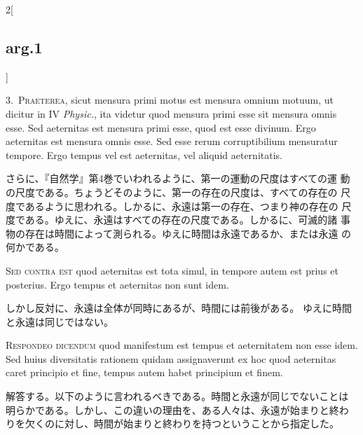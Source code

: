 \documentclass[paper=a4paper,fontsize=10pt,jafontsize=9pt,titlepage]{jlreq}
\begin{document}
\begin{paracol}{2}[\subsection{arg.1}]

3.~{\scshape Praeterea}, sicut mensura primi motus est mensura omnium
motuum, ut dicitur in IV {\itshape Physic.}, ita videtur quod mensura primi esse
sit mensura omnis esse. Sed aeternitas est mensura primi esse, quod est
esse divinum. Ergo aeternitas est mensura omnis esse. Sed esse rerum
corruptibilium mensuratur tempore. Ergo tempus vel est aeternitas, vel
aliquid aeternitatis.

\switchcolumn

さらに、『自然学』第4巻でいわれるように、第一の運動の尺度はすべての運
動の尺度である。ちょうどそのように、第一の存在の尺度は、すべての存在の
尺度であるように思われる。しかるに、永遠は第一の存在、つまり神の存在の
尺度である。ゆえに、永遠はすべての存在の尺度である。しかるに、可滅的諸
事物の存在は時間によって測られる。ゆえに時間は永遠であるか、または永遠
の何かである。

\switchcolumn*[\subsection{s.c.}]

{\scshape Sed contra est} quod aeternitas est tota simul, in tempore
autem est prius et posterius. Ergo tempus et aeternitas non sunt idem.

\switchcolumn

しかし反対に、永遠は全体が同時にあるが、時間には前後がある。
ゆえに時間と永遠は同じではない。


{\scshape Respondeo dicendum} quod manifestum est tempus et aeternitatem
non esse idem. Sed huius diversitatis rationem quidam assignaverunt ex
hoc quod aeternitas caret principio et fine, tempus autem habet
principium et finem.

\switchcolumn

解答する。以下のように言われるべきである。時間と永遠が同じでないことは
明らかである。しかし、この違いの理由を、ある人々は、永遠が始まりと終わ
りを欠くのに対し、時間が始まりと終わりを持つということから指定した。

\switchcolumn*


\end{paracol}
\end{document}
